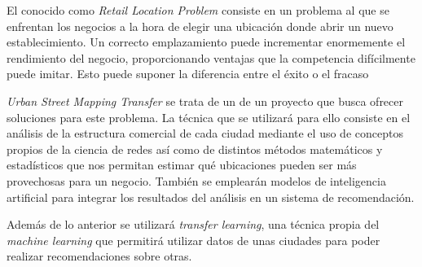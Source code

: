 

El conocido como \textit{Retail Location Problem} consiste en un problema al que se enfrentan los negocios a la hora de elegir una ubicación donde abrir un nuevo establecimiento. Un correcto emplazamiento puede incrementar enormemente el rendimiento del negocio, proporcionando ventajas que la competencia difícilmente puede imitar. Esto puede suponer la diferencia entre el éxito o el fracaso 

\textit{Urban Street Mapping Transfer} se trata de un de un proyecto que busca ofrecer soluciones para este problema. La técnica que se utilizará para ello consiste en el análisis de la estructura comercial de cada ciudad mediante el uso de conceptos propios de la ciencia de redes así como de distintos métodos matemáticos y estadísticos que nos permitan estimar qué ubicaciones pueden ser más provechosas para un negocio. También se emplearán modelos de inteligencia artificial para integrar los resultados del análisis en un sistema de recomendación.

Además de lo anterior se utilizará \textit{transfer learning}, una técnica propia del \textit{machine learning} que permitirá utilizar datos de unas ciudades para poder realizar recomendaciones sobre otras.
